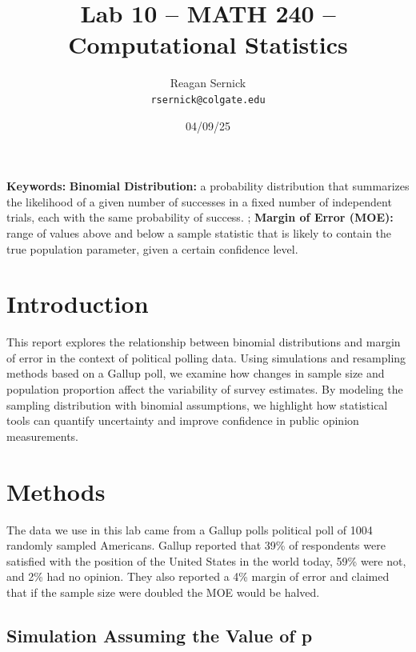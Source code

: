 \documentclass{article}\usepackage[]{graphicx}\usepackage[]{xcolor}
\begin{document}
\vspace{-1in}
\title{Lab 10 -- MATH 240 -- Computational Statistics}

\author{
  Reagan Sernick \\
  {\tt rsernick@colgate.edu}
}

\date{04/09/25}

\maketitle

\begin{multicols}{2}

\noindent \textbf{Keywords:} \textbf{Binomial Distribution:} a probability distribution that summarizes the likelihood of a given number of successes in a fixed number of independent trials, each with the same probability of success.
; \textbf{Margin of Error (MOE):} range of values above and below a sample statistic that is likely to contain the true population parameter, given a certain confidence level.

\section{Introduction}

This report explores the relationship between binomial distributions and margin of error in the context of political polling data. Using simulations and resampling methods based on a Gallup poll, we examine how changes in sample size and population proportion affect the variability of survey estimates. By modeling the sampling distribution with binomial assumptions, we highlight how statistical tools can quantify uncertainty and improve confidence in public opinion measurements.

\section{Methods}

The data we use in this lab came from a Gallup polls political poll of 1004 randomly sampled Americans. Gallup reported that 39\% of respondents were satisfied with the position of the United States in the world today, 59\% were not, and 2\% had no opinion. They also reported a 4\% margin of error and claimed that if the sample size were doubled the MOE would be halved.

\subsection{Simulation Assuming the Value of p}


\end{multicols}
\end{document}
